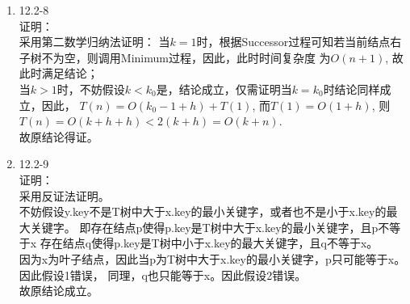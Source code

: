 \documentclass[UTF8]{ctexart}
\begin{document}
\begin{enumerate}
	\item 12.2-8 \\
	证明：\\
		采用第二数学归纳法证明：
		当$k=1$时，根据Successor过程可知若当前结点右子树不为空，则调用Minimum过程，因此，此时时间复杂度
		为$O(n+1)$, 故此时满足结论；\\
		当$k>1$时，不妨假设$k<k_0$是，结论成立，仅需证明当$k=k_0$时结论同样成立，因此，
		$T(n) = O(k_0-1+h) + T(1)$, 而$T(1) = O(1+h)$, 则$T(n) = O(k+h+h) < 2(k+h) = O(k+n)$.	\\
		故原结论得证。
	
	\item 12.2-9 \\
	证明：\\
		采用反证法证明。\\
		不妨假设y.key不是T树中大于x.key的最小关键字，或者也不是小于x.key的最大关键字。
		即存在结点p使得p.key是T树中大于x.key的最小关键字，且p不等于x
		  存在结点q使得p.key是T树中小于x.key的最大关键字，且q不等于x。\\
		因为x为叶子结点，因此当p为T树中大于x.key的最小关键字，p只可能等于x。因此假设1错误，
		同理，q也只能等于x。因此假设2错误。\\
		故原结论成立。

\end{enumerate}
\end{document}
